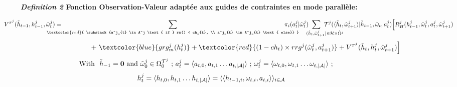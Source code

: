 \begin{figure}[h!]
  \label{eq:single_value_function}
  \raggedright
  \textbf{\textit{Definition 2} \quad Fonction Observation-Valeur adaptée aux guides de contraintes en mode parallèle:}

  \begin{scriptsize}
    \vspace{-0.6cm}
    \begin{gather*}
      \hspace{-1cm}V^{\pi^j}(\tilde{h}_{t-1},h^j_{t-1},\hat{\omega}^j_t) = \hspace{-0.95cm}
      \sum_{\textcolor{red}{ \substack{a^j_{t} \in A^j \text{ if } rn() < ch_{t}, \\
      a^j_{t} \in A^j_{t} \text{ else}}
      }}{\hspace{-0.9cm} \pi_i(a^j_{t} | \hat{\omega}^j_t)}
      \hspace{-1.2cm}
      \sum_{\phantom{XXXX}(\tilde{h}_t,\hat{\omega}^j_{t+1}) \in \mathcal{H} \times \hat{\Omega}^j}
      {\hspace{-1.2cm} \mathcal{T}^j(\langle \tilde{h}_t,\hat{\omega}^j_{t+1} \rangle | \tilde{h}_{t-1}, \hat{\omega}_t, a^j_{t})
      \Bigl[R^j_H(h^j_{t-1},\hat{\omega}^j_t,a^j_t,\hat{\omega}^j_{t+1}) \hspace{-0.1cm} }
    \end{gather*}
    \vspace{-1cm}
    \begin{gather*}
      \hspace{3cm}
      {+ \  \textcolor{blue}{grg^j_m(h^j_t)}
      +
      \textcolor{red}{(1-ch_t) \times rrg^j(\hat{\omega}^j_t,a^j_{t+1})} + V^{\pi^j}(\tilde{h}_{t}, h^j_t, \hat{\omega}^j_{t+1})\Bigr]}
    \end{gather*}
    \vspace{-0.15cm}
    \[\hspace{-0.9cm}\text{With \ } \tilde{h}_{-1} = \mathbf{0} \text{ and } \tilde{\omega}^j_0 \in \Omega_0^{\mathcal{T}^j} \text{ ; } a^j_t = \langle a_{t,0}, a_{t,1} \dots a_{t,|\mathcal{A}|} \rangle \text{ ; } \omega^j_t = \langle \omega_{t,0}, \omega_{t,1} \dots \omega_{t,|\mathcal{A}|} \rangle \text{ ; }\]
    \vspace{-0.25cm}
    \[\hspace{-0.5cm} h^j_t = \langle h_{t,0}, h_{t,1} \dots h_{t,|\mathcal{A}|} \rangle = \langle \langle h_{t-1,i}, \omega_{t,i}, a_{t,i} \rangle \rangle_{i \in \mathcal{A}}\]
    \vspace{-0.2cm}

\end{scriptsize}
\end{figure}
